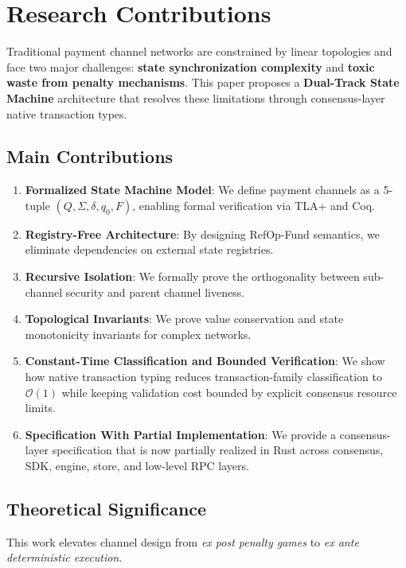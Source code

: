 \section{Research Contributions}

Traditional payment channel networks are constrained by linear topologies and face two major challenges: \textbf{state synchronization complexity} and \textbf{toxic waste from penalty mechanisms}. This paper proposes a \textbf{Dual-Track State Machine} architecture that resolves these limitations through consensus-layer native transaction types.

\subsection{Main Contributions}

\begin{enumerate}
    \item \textbf{Formalized State Machine Model}: We define payment channels as a 5-tuple $(Q, \Sigma, \delta, q_0, F)$, enabling formal verification via TLA+ and Coq.
    \item \textbf{Registry-Free Architecture}: By designing RefOp-Fund semantics, we eliminate dependencies on external state registries.
    \item \textbf{Recursive Isolation}: We formally prove the orthogonality between sub-channel security and parent channel liveness.
    \item \textbf{Topological Invariants}: We prove value conservation and state monotonicity invariants for complex networks.
    \item \textbf{Constant-Time Classification and Bounded Verification}: We show how native transaction typing reduces transaction-family classification to $\mathcal{O}(1)$ while keeping validation cost bounded by explicit consensus resource limits.
    \item \textbf{Specification With Partial Implementation}: We provide a consensus-layer specification that is now partially realized in Rust across consensus, SDK, engine, store, and low-level RPC layers.
\end{enumerate}

\subsection{Theoretical Significance}

This work elevates channel design from \textit{ex post penalty games} to \textit{ex ante deterministic execution}.

